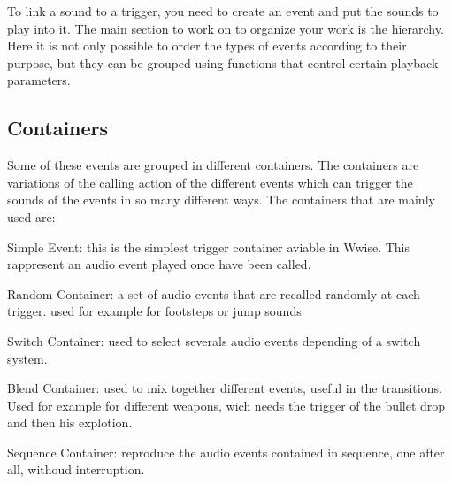 To link a sound to a trigger, you need to create an event and put the sounds to play into it. The main section to work on to organize your work is the hierarchy. Here it is not only possible to order the types of events according to their purpose, but they can be grouped using functions that control certain playback parameters. 

	\subsection{Containers}
	Some of these events are grouped in different containers. The containers are variations of the calling action of the different events which can trigger the sounds of the events in so many different ways. The containers that are mainly used are:
	
	\begin{compactitem}
		\item Simple Event: this is the simplest trigger container aviable in Wwise. This rappresent an audio event played once have been called.
		\item Random Container:  a set of audio events that are recalled randomly at each trigger. used for example for footsteps or jump sounds
		\item Switch Container: used to select severals audio events depending of a switch system.
		\item Blend Container: used to mix together different events, useful in the transitions. Used for example for different weapons, wich needs the trigger of the bullet drop and then his explotion.
		\item Sequence Container: reproduce the audio events contained in sequence, one after all, withoud interruption.
	\end{compactitem}

